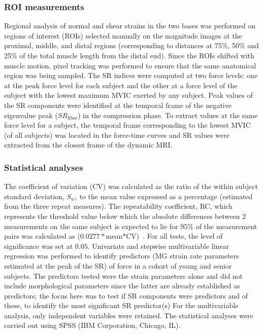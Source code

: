 \subsubsection{ROI measurements}
Regional analysis of normal and shear strains in the two bases was performed on regions of interest (ROIs) selected manually on the magnitude images at the proximal, middle, and distal regions (corresponding to distances at 75\%, 50\% and 25\% of the total muscle length from the distal end). 
Since the ROIs shifted with muscle motion, pixel tracking was performed to ensure that the same anatomical region was being sampled.
The SR indices were computed at two force levels: one at the peak force level for each subject and the other at a force level of the subject with the lowest maximum MVIC exerted by any subject. 
Peak values of the SR components were identified at the temporal frame of the negative eigenvalue peak ($SR_{\mathrm{fiber}}$) in the compression phase.
To extract values at the same force level for a subject, the temporal frame corresponding to the lowest MVIC (of all subjects) was located in the force-time curves and SR values were extracted from the closest frame of the dynamic MRI.
\subsubsection{Statistical analyses}
The coefficient of variation (CV) was calculated as the ratio of the within subject standard deviation, $S_w$, to the mean value expressed as a percentage (estimated from the three repeat measures). 
The repeatability coefficient, RC, which represents the threshold value below which the absolute differences between 2 measurements on the same subject is expected to lie for $95\%$ of the measurement pairs was calculated as ($0.0277*$mean$*$CV)~\cite{RNSS13}.
For all tests, the level of significance was set at $0.05$.
Univariate and stepwise multivariable linear regression was performed to identify predictors (MG strain rate parameters estimated at the peak of the SR) of force in a cohort of young and senior subjects.
The predictors tested were the strain parameters alone and did not include morphological parameters since the latter are already established as predictors; the focus here was to test if SR components were predictors and of these, to identify the most significant SR predictor(s)
For the multivariable analysis, only independent variables were retained.
The statistical analyses were carried out using SPSS (IBM Corporation, Chicago, IL).
